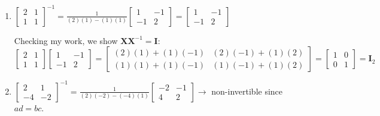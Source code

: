 \documentclass[12pt]{article}
\begin{document}
\begin{enumerate}
    \item $\begin{bmatrix}
    2&1 \\ 1&1\end{bmatrix}^{-1} = \frac{1}{(2)(1)-(1)(1)} \begin{bmatrix}
    1&-1 \\ -1&2\end{bmatrix} = \begin{bmatrix}
    1&-1 \\ -1&2\end{bmatrix}$
    
    Checking my work, we show  $\mathbf{X}\mathbf{X}^{-1} = \mathbf{I}:$
    \[ \begin{bmatrix}   2&1 \\ 1&1\end{bmatrix}
    \begin{bmatrix}
    1&-1 \\ -1&2\end{bmatrix}
    = \begin{bmatrix}
    (2)(1) + (1)(-1) & 
    (2)(-1) + (1)(2)
        \\ (1)(1)+ (1)(-1) &  (1)(-1)+ (1)(2)   \end{bmatrix}
    =\begin{bmatrix}
    1&0 \\ 0&1
    \end{bmatrix} = \mathbf{I}_2
     \]
    
    \item $\begin{bmatrix}
    2&1 \\ -4&-2\end{bmatrix}^{-1}= \frac{1}{(2)(-2)-(-4)(1)}\begin{bmatrix} -2&-1 \\ 4&2\end{bmatrix} \to $ non-invertible since $ad=bc$.
    

\end{enumerate}
\end{document}
